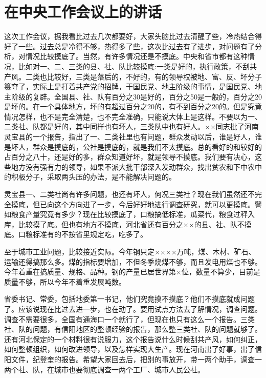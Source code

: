 \section{在中央工作会议上的讲话}

这次工作会议，据我看比过去几次都要好，大家头脑比过去清醒了些，冷热结合得好了一些。过去总是冷得不够，热得多了些，这次比过去有了进步，对问题有了分析，对情况比较摸底了。当然，有许多情况还是不摸底。中央和省市都有这种情况，比如对一、二、三类的县、社、队比较摸底:一类是好的，执行政策，不刮共产风。二类也比较好，三类是落后的，不好的，有的领导权被地、富、反、坏分子篡夺了，实际上是打着共产党的招牌，干国民党、地主阶级的事情，是国民党、地主阶级的复辟。全国县、社、队有百分之30是好的，百分之50是一般的，百分之20是坏的。在一个具体地方，坏的有超过百分之20的，有不到百分之20的。但是究竟情况怎样，也不是完全清楚，也不完全准确，只能说大体上是这样。不要以为一、二类社、队都是好的，其中同样也有坏人，三类队中也有好人。××同志批了河南灵宝县的一个报告，指出了一、二类社里也有问题，群众发动以后，谁是好人，谁是坏人，群众是摸底的，公社是摸底的，就是我们不太摸底。总的看好的和较好的占百分之八十，还是好的多，群众知道好坏，就是领导不摸底。我们要有决心，这些地方没有强有力的领导，如果不派大批干部深入发动群众，找出贫农和下中农中的积极分子，采取两头压的办法，是不能解决问题的。

灵宝县一、二类社尚有许多问题，也还有坏人，何况三类社？现在我们虽然还不完全摸底，但已向这个方向进了一步，今后好好地进行调查研究，就可以更摸底。譬如粮食产量究竟有多少？现在比较摸底了，口粮搞低标准，瓜菜代，粮食过秤入库，比较摸了底。但也有地方不摸底，河北省还有百分之××的县、社、队不摸底。口粮标准有的不按省里规定吃，吃多了。

至于城市工业问题，比较接近实际。今年钢只定××××万吨，煤、木材、矿石、运输还得搞那么多。煤的指标要增加，不但冬季烧煤不够，而且发电用煤也不够。今年着重在搞质量、规格、品种。钢的产量已居世界第×位，数量不算少，目前是质量不够，所以今年不着重发展吨数。

省委书记、常委，包括地委第一书记，他们究竟摸不摸底？他们不摸底就成问题了。应该说现在比过去进一步，也在动了。要用试点方法去了解情况，调查问题。调查不需要很多，全国有通海口一个就行了，但现在也只有这么一个报告。三类社、队的问题，有信阳地区的整顿经验的报告，那么整三类社、队的问题就够了。还有河北保定的一个材料很有说服力，这个报告说什么时候刮共产风，如何纠正，如何整顿组织，如何改进领导，以及怎样实现大生产。现在河南出了好事，出了信阳文件，纪登奎的报告。希望大家回去后，把别的事放开，带一两个助手，调查一两个社、队，在城市也要彻底调查一两个工厂、城市人民公社。

